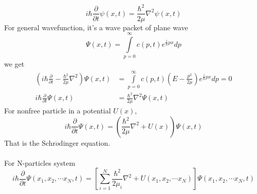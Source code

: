 \begin{frame}[allowframebreaks=]
    \begin{equation*}
        i\hbar \frac{\partial }{\partial t} \psi(x,t) = \frac{\hbar^2}{2\mu} \nabla^2 \psi(x,t)
    \end{equation*}
    For general wavefunction, it's a wave packet of plane wave
    \begin{equation*}
        \Psi(x,t)= \int\limits_{p=0} ^{\infty} c(p,t) e^{\frac{i}{\hbar}px}dp
    \end{equation*}
    we get 
    \begin{equation*}
        \begin{split}
        (i\hbar \frac{\partial }{\partial t} - \frac{\hbar^2}{2\mu} \nabla^2 )\Psi(x,t) &= \int\limits_{p=0} ^{\infty} c(p,t) (E-\frac{p^2}{2\mu}) e^{\frac{i}{\hbar}px}dp=0  \\
        i\hbar \frac{\partial }{\partial t} \Psi(x,t) &= \frac{\hbar^2}{2\mu} \nabla^2 \Psi(x,t)
        \end{split}
    \end{equation*}
    For nonfree particle in a potential $U(x)$,
    \begin{equation*}
        i\hbar \frac{\partial }{\partial t} \Psi(x,t) = (\frac{\hbar^2}{2\mu} \nabla^2 +U(x)) \Psi(x,t)
    \end{equation*}
    That is the Schr$\ddot{o}$dinger equation. \\
    ~~\\
    \bullet For N-particles system
   {\small \begin{equation*}
        i\hbar \frac{\partial }{\partial t} \Psi(x_1, x_2, \cdots x_N,t) = [\sum_{i=1} ^{N} \frac{\hbar ^2}{2\mu_i} \nabla^2 +U(x_1, x_2, \cdots x_N)] \Psi(x_1, x_2, \cdots x_N,t)
    \end{equation*}}
\end{frame}

\begin{frame}

\end{frame}

\begin{frame}
\end{frame}

\begin{frame}
\end{frame}

\begin{frame}
\end{frame}

\begin{frame}
\end{frame}

\begin{frame}
\end{frame}

